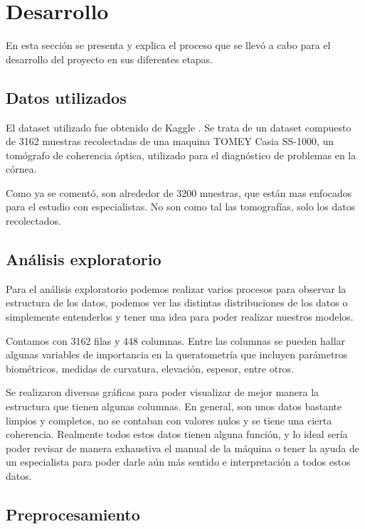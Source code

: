 \documentclass{replab}
\begin{document}
\section{Desarrollo}

En esta sección se presenta y explica el proceso que se llevó a cabo para el desarrollo del proyecto en sus diferentes etapas.

\subsection{Datos utilizados}

El dataset utilizado fue obtenido de Kaggle \cite{bakir}. Se trata de un dataset compuesto de 3162 muestras recolectadas de una maquina TOMEY Casia SS-1000, un tomógrafo de coherencia óptica, utilizado para el diagnóstico de problemas en la córnea.

Como ya se comentó, son alrededor de 3200 muestras, que están mas enfocados para el estudio con especialistas. No son como tal las tomografías, solo los datos recolectados.

\subsection{Análisis exploratorio}

Para el análisis exploratorio podemos realizar varios procesos para observar la estructura de los datos, podemos ver las distintas distribuciones de los datos o simplemente entenderlos y tener una idea para poder realizar nuestros modelos.

Contamos con 3162 filas y 448 columnas. Entre las columnas se pueden hallar algunas variables de importancia en la queratometría que incluyen parámetros biométricos, medidas de curvatura, elevación, espesor, entre otros.

Se realizaron diversas gráficas para poder visualizar de mejor manera la estructura que tienen algunas columnas. En general, son unos datos bastante limpios y completos, no se contaban con valores nulos y se tiene una cierta coherencia. Realmente todos estos datos tienen alguna función, y lo ideal sería poder revisar de manera exhaustiva el manual de la máquina o tener la ayuda de un especialista para poder darle aún más sentido e interpretación a todos estos datos.

\subsection{Preprocesamiento}
\end{document}
